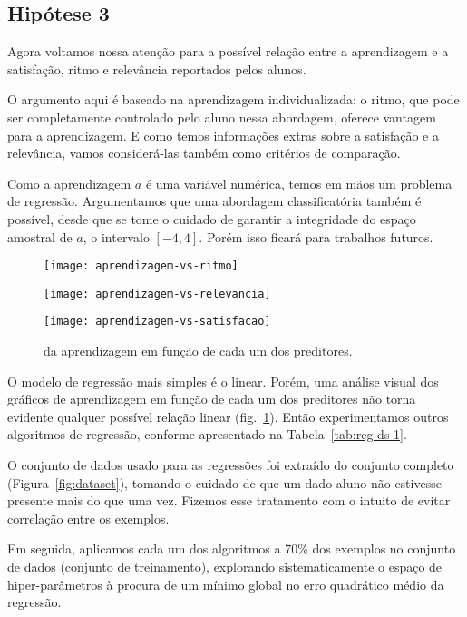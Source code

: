 \subsection{Hipótese 3}

Agora voltamos nossa atenção para a possível relação entre a aprendizagem e a satisfação, ritmo e relevância reportados pelos alunos.

O argumento aqui é baseado na aprendizagem individualizada: o ritmo, que pode ser completamente controlado pelo aluno nessa abordagem, oferece vantagem para a aprendizagem.
E como temos informações extras sobre a satisfação e a relevância, vamos considerá-las também como critérios de comparação.

Como a aprendizagem $a$ é uma variável numérica, temos em mãos um problema de regressão.
Argumentamos que uma abordagem classificatória também é possível, desde que se tome o cuidado de garantir a integridade do espaço amostral de $a$, o intervalo $[-4,4]$.
Porém isso ficará para trabalhos futuros.

\begin{figure}[t]
	\centering

	\texttt{[image: aprendizagem-vs-ritmo]}

	\texttt{[image: aprendizagem-vs-relevancia]}

	\texttt{[image: aprendizagem-vs-satisfacao]}

	\caption{ da aprendizagem em função de cada um dos preditores.}
	\label{fig:bubble-plots}
\end{figure}

O modelo de regressão mais simples é o linear.
Porém, uma análise visual dos gráficos de aprendizagem em função de cada um dos preditores não torna evidente qualquer possível relação linear (fig.~\ref{fig:bubble-plots}).
Então experimentamos outros algoritmos de regressão, conforme apresentado na Tabela~\ref{tab:reg-ds-1}.

O conjunto de dados usado para as regressões foi extraído do conjunto completo (Figura~\ref{fig:dataset}), tomando o cuidado de que um dado aluno não estivesse presente mais do que uma vez.
Fizemos esse tratamento com o intuito de evitar correlação entre os exemplos.

Em seguida, aplicamos cada um dos algoritmos a 70\% dos exemplos no conjunto de dados (conjunto de treinamento), explorando sistematicamente o espaço de hiper-parâmetros à procura de um mínimo global no erro quadrático médio da regressão.

